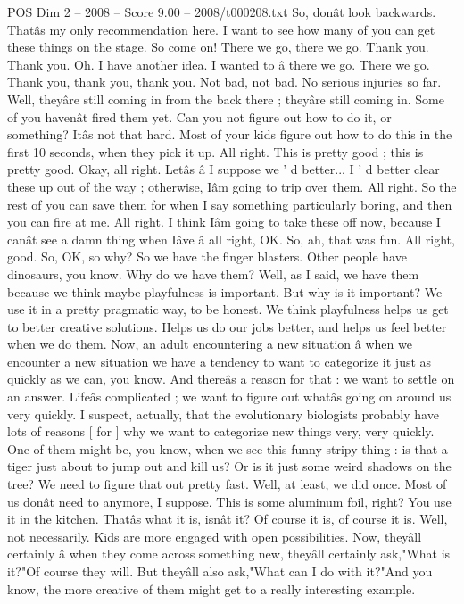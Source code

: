 \begin{textsample}{POS Dim 2 – 2008 – Score 9.00 – 2008/t000208.txt}
So, donât look backwards.
Thatâs my only recommendation here.
I want to see how many of you can get these things on the stage.
So come on!
There we go, there we go.
Thank you.
Thank you.
Oh.
I have another idea.
I wanted to â there we go.
There we go.
Thank you, thank you, thank you.
Not bad, not bad.
No serious injuries so far.
Well, theyâre still coming in from the back there ; theyâre still coming in.
Some of you havenât fired them yet.
Can you not figure out how to do it, or something?
Itâs not that hard.
Most of your kids figure out how to do this in the first 10 seconds, when they pick it up.
All right.
This is pretty good ; this is pretty good.
Okay, all right.
Letâs â I suppose we ' d better...
I ' d better clear these up out of the way ; otherwise, Iâm going to trip over them.
All right.
So the rest of you can save them for when I say something particularly boring, and then you can fire at me.
All right.
I think Iâm going to take these off now, because I canât see a damn thing when Iâve â all right, OK.
So, ah, that was fun.
All right, good.
So, OK, so why?
So we have the finger blasters.
Other people have dinosaurs, you know.
Why do we have them?
Well, as I said, we have them because we think maybe playfulness is important.
But why is it important?
We use it in a pretty pragmatic way, to be honest.
We think playfulness helps us get to better creative solutions.
Helps us do our jobs better, and helps us feel better when we do them.
Now, an adult encountering a new situation â when we encounter a new situation we have a tendency to want to categorize it just as quickly as we can, you know.
And thereâs a reason for that : we want to settle on an answer.
Lifeâs complicated ; we want to figure out whatâs going on around us very quickly.
I suspect, actually, that the evolutionary biologists probably have lots of reasons [ for ] why we want to categorize new things very, very quickly.
One of them might be, you know, when we see this funny stripy thing : is that a tiger just about to jump out and kill us?
Or is it just some weird shadows on the tree?
We need to figure that out pretty fast.
Well, at least, we did once.
Most of us donât need to anymore, I suppose.
This is some aluminum foil, right?
You use it in the kitchen.
Thatâs what it is, isnât it?
Of course it is, of course it is.
Well, not necessarily.
Kids are more engaged with open possibilities.
Now, theyâll certainly â when they come across something new, theyâll certainly ask,"What is it?"Of course they will.
But theyâll also ask,"What can I do with it?"And you know, the more creative of them might get to a really interesting example.

\end{textsample}
